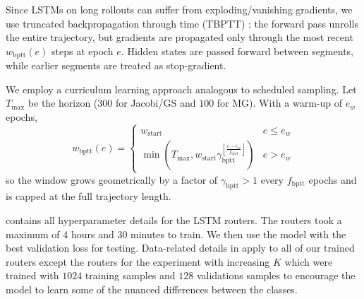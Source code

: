 \documentclass{article} %
\begin{document}
Since LSTMs on long rollouts can suffer from exploding/vanishing gradients, we use truncated backpropagation through time (TBPTT) \citep{mozer2013focused,robinson1987utility,werbos1988generalization}: the forward pass unrolls the entire trajectory, but gradients are propagated only through the most recent $w_{\text{bptt}}(e)$ steps at epoch $e$. Hidden states are passed forward between segments, while earlier segments are treated as stop-gradient.

We employ a curriculum learning approach analogous to scheduled sampling. Let $T_{\max}$ be the horizon ($300$ for Jacobi/GS and $100$ for MG). With a warm-up of $e_w$ epochs,
\begin{equation}
    w_{\text{bptt}}(e)  = 
    \begin{cases}
        w_{\text{start}} & e \leq e_w \\
        \min\left(T_{\max}, w_{\text{start}}\gamma_{\text{bptt}}^{\left\lfloor \frac{e - e_w}{f_{\text{bptt}}}\right\rfloor} \right) & e > e_w
    \end{cases}
\end{equation}
so the window grows geometrically by a factor of $\gamma_{\text{bptt}} > 1$ every $f_{\text{bptt}}$ epochs and is capped at the full trajectory length.

 contains all hyperparameter details for the LSTM routers. The routers took a maximum of 4 hours and 30 minutes to train. We then use the model with the best validation loss for testing.  Data-related details in   apply to all of our trained routers except the routers for the experiment with increasing $K$ which were trained with $1024$ training samples and $128$ validations samples to encourage the model to learn some of the nuanced differences between the classes.
\end{document}
